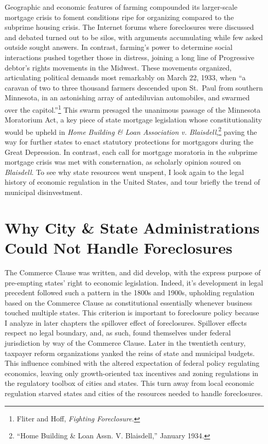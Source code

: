 \documentclass[12pt,oneside]{psthesis}
\begin{document}
Geographic and economic features of farming compounded its larger-scale mortgage crisis to foment conditions ripe for organizing compared to the subprime housing crisis.
The Internet forums where foreclosures were discussed and debated turned out to be silos, with arguments accumulating while few asked outside sought answers.
In contrast, farming's power to determine social interactions pushed together those in distress, joining a long line of Progressive debtor's rights movements in the Midwest.
These movements organized, articulating political demands most remarkably on March 22, 1933, when ``a caravan of two to three thousand farmers descended upon St.~Paul from southern Minnesota, in an astonishing array of antediluvian automobiles, and swarmed over the capitol.''\footnote{Fliter and Hoff, \emph{Fighting Foreclosure}.}
This swarm presaged the unanimous passage of the Minnesota Moratorium Act, a key piece of state mortgage legislation whose constitutionality would be upheld in \emph{Home Building \& Loan Association v. Blaisdell},\footnote{``Home Building \& Loan Assn. V. Blaisdell,'' January 1934.} paving the way for further states to enact statutory protections for mortgagors during the Great Depression.
In contrast, each call for mortgage moratoria in the subprime mortgage crisis was met with consternation, as scholarly opinion soured on \emph{Blaisdell}.
To see why state resources went unspent, I look again to the legal history of economic regulation in the United States, and tour briefly the trend of municipal disinvestment.

\hypertarget{cities-states}{%
\section{Why City \& State Administrations Could Not Handle Foreclosures}\label{cities-states}}

The Commerce Clause was written, and did develop, with the express purpose of pre-empting states' right to economic legislation.
Indeed, it's development in legal precedent followed such a pattern in the 1800s and 1900s, upholding regulation based on the Commerce Clause as constitutional essentially whenever business touched multiple states.
This criterion is important to foreclosure policy because I analyze in later chapters the spillover effect of foreclosures.
Spillover effects respect no legal boundary, and, as such, found themselves under federal jurisdiction by way of the Commerce Clause.
Later in the twentieth century, taxpayer reform organizations yanked the reins of state and municipal budgets.
This influence combined with the altered expectation of federal policy regulating economics, leaving only growth-oriented tax incentives and zoning regulations in the regulatory toolbox of cities and states.
This turn away from local economic regulation starved states and cities of the resources needed to handle foreclosures.
\end{document}
